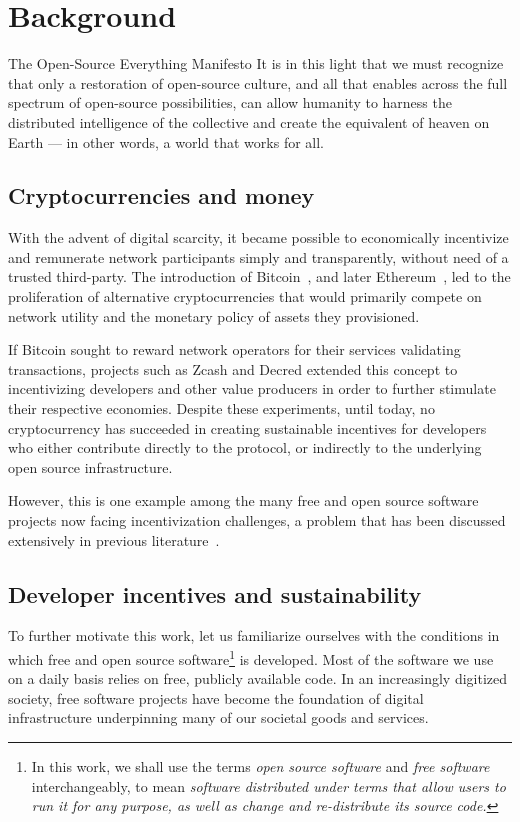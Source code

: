 \section{Background}

\begin{epigraph}{The Open-Source Everything Manifesto}
    \noindent It is in this light that we must recognize that only a restoration of
    open-source culture, and all that enables across the full spectrum of
    open-source possibilities, can allow humanity to harness the distributed
    intelligence of the collective and create the equivalent of heaven on Earth
    --- in other words, a world that works for all.
\end{epigraph}

\subsection{Cryptocurrencies and money}

With the advent of digital scarcity, it became possible to economically
incentivize and remunerate network participants simply and transparently,
without need of a trusted third-party. The introduction of
Bitcoin~\cite{bitcoin}, and later Ethereum~\cite{ethereum}, led to the
proliferation of alternative cryptocurrencies that would primarily compete on
network utility and the monetary policy of assets they provisioned.

If Bitcoin sought to reward network operators for their services validating
transactions, projects such as Zcash and Decred extended this concept to
incentivizing developers and other value producers in order to further stimulate
their respective economies. Despite these experiments, until today, no cryptocurrency
has succeeded in creating sustainable incentives for developers who either
contribute directly to the protocol, or indirectly to the underlying open source
infrastructure.

However, this is one example among the many free and open source software projects
now facing incentivization challenges, a problem that has been
discussed extensively in previous literature~\cite{roads and bridges}.

\subsection{Developer incentives and sustainability}
\label{s:incentives}

To further motivate this work, let us familiarize ourselves with the
conditions in which free and open source software\footnote{In this work, we
shall use the terms \emph{open source software} and \emph{free software} interchangeably,
to mean \emph{software distributed under terms that allow users to run it
for any purpose, as well as change and re-distribute its source code.}}
is developed. Most of the software we use on a daily basis relies on free,
publicly available code. In an increasingly digitized society, free software
projects have become the foundation of digital infrastructure underpinning many
of our societal goods and services.

